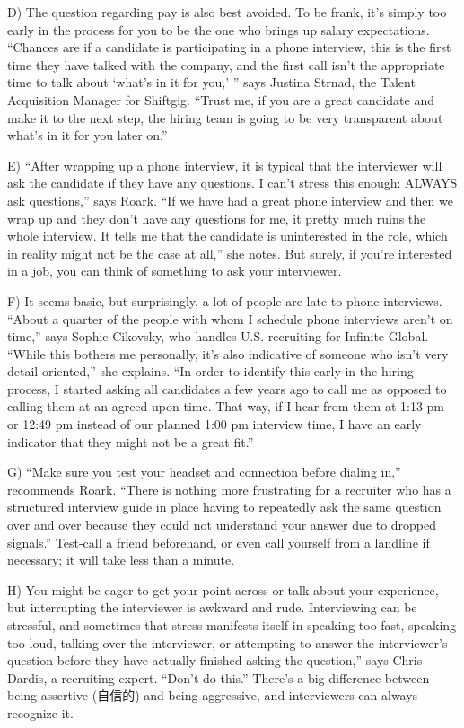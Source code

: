 \documentclass[UTF8,11pt]{ctexart}
\begin{document}
D) The question regarding pay is also best avoided. To be frank, it’s simply too early in the process for you to be the one who brings up salary expectations. “Chances are if a candidate is participating in a phone interview, this is the first time they have talked with the company, and the first call isn’t the appropriate time to talk about ‘what’s in it for you,’ ” says Justina Strnad, the Talent Acquisition Manager for Shiftgig. “Trust me, if you are a great candidate and make it to the next step, the hiring team is going to be very transparent about what’s in it for you later on.”


E) “After wrapping up a phone interview, it is typical that the interviewer will ask the candidate if they have any questions. I can’t stress this enough: ALWAYS ask questions,” says Roark. “If we have had a great phone interview and then we wrap up and they don’t have any questions for me, it pretty much ruins the whole interview. It tells me that the candidate is uninterested in the role, which in reality might not be the case at all,” she notes. But surely, if you’re interested in a job, you can think of something to ask your interviewer.


F) It seems basic, but surprisingly, a lot of people are late to phone interviews. “About a quarter of the people with whom I schedule phone interviews aren’t on time,” says Sophie Cikovsky, who handles U.S. recruiting for Infinite Global. “While this bothers me personally, it’s also indicative of someone who isn’t very detail-oriented,” she explains. “In order to identify this early in the hiring process, I started asking all candidates a few years ago to call me as opposed to calling them at an agreed-upon time. That way, if I hear from them at 1:13 pm or 12:49 pm instead of our planned 1:00 pm interview time, I have an early indicator that they might not be a great fit.”


G) “Make sure you test your headset and connection before dialing in,” recommends Roark. “There is nothing more frustrating for a recruiter who has a structured interview guide in place having to repeatedly ask the same question over and over because they could not understand your answer due to dropped signals.” Test-call a friend beforehand, or even call yourself from a landline if necessary; it will take less than a minute.


H) You might be eager to get your point across or talk about your experience, but interrupting the interviewer is awkward and rude. Interviewing can be stressful, and sometimes that stress manifests itself in speaking too fast, speaking too loud, talking over the interviewer, or attempting to answer the interviewer’s question before they have actually finished asking the question,” says Chris Dardis, a recruiting expert. “Don’t do this.” There’s a big difference between being assertive (自信的) and being aggressive, and interviewers can always recognize it.
\end{document}
